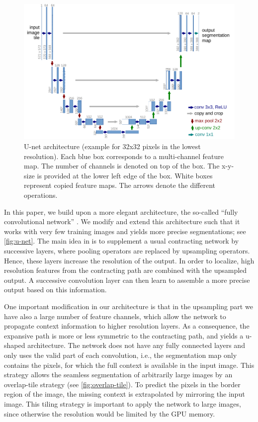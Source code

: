 \documentclass{llncs}
\begin{document}
\begin{figure}[t]
  \centering
  \includegraphics[width=\textwidth]{u-net-illustration-correct-scale2}
  \caption{U-net architecture (example for 32x32 pixels in the lowest resolution). Each blue box corresponds to a multi-channel feature map. The number of channels is denoted on top of the box. The x-y-size is provided at the lower left edge of the box. White boxes represent copied feature maps. The arrows denote the different operations. 
  }
  \label{fig:u-net}
\end{figure}

In this paper, we build upon a more elegant architecture, the so-called ``fully convolutional network'' \cite{fullyconv}. We modify and extend this architecture such that it works with very few training images and yields more precise segmentations; see \autoref{fig:u-net}. The main idea in \cite{fullyconv} is to supplement a usual contracting network by successive layers, where pooling operators are replaced by upsampling operators. Hence, these layers increase the resolution of the output. In order to localize, high resolution features from the contracting path are combined with the upsampled output. A successive convolution layer can then learn to assemble a more precise output based on this information.

One important modification in our architecture is that in the upsampling part we have also a large number of feature channels, which allow the network to propagate context information to higher resolution layers. As a consequence, the expansive path is more or less symmetric to the contracting path, and yields a u-shaped architecture. The network does not have any fully connected layers and only uses the valid part of each convolution, i.e., the segmentation map only contains the pixels, for which the full context is available in the input image. This strategy allows the seamless segmentation of arbitrarily large images by an overlap-tile strategy (see \autoref{fig:overlap-tile}). To predict the pixels in the border region of the image, the missing context is extrapolated by mirroring the input image. This tiling strategy is important to apply the network to large images, since otherwise the resolution would be limited by the GPU memory.
\end{document}
